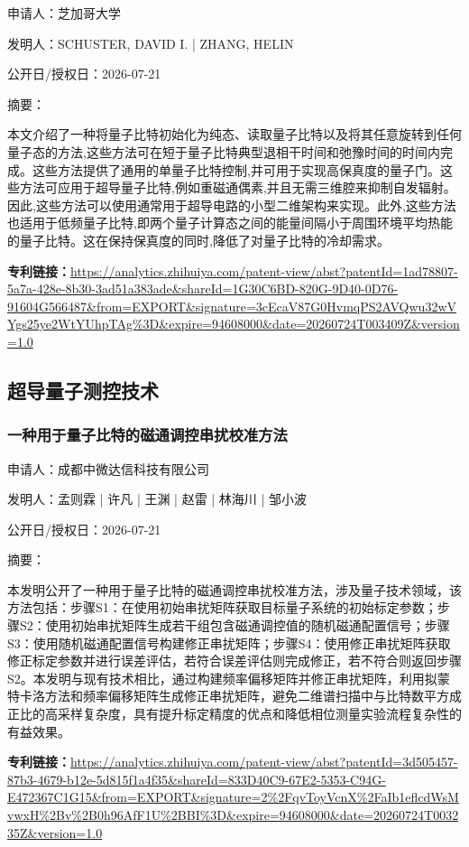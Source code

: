 \documentclass[12pt,a4paper]{ctexart}
\begin{document}
申请人：芝加哥大学

发明人：SCHUSTER, DAVID I. | ZHANG, HELIN

公开日/授权日：2026-07-21

摘要：

本文介绍了一种将量子比特初始化为纯态、读取量子比特以及将其任意旋转到任何量子态的方法,这些方法可在短于量子比特典型退相干时间和弛豫时间的时间内完成。这些方法提供了通用的单量子比特控制,并可用于实现高保真度的量子门。这些方法可应用于超导量子比特,例如重磁通偶素,并且无需三维腔来抑制自发辐射。因此,这些方法可以使用通常用于超导电路的小型二维架构来实现。此外,这些方法也适用于低频量子比特,即两个量子计算态之间的能量间隔小于周围环境平均热能的量子比特。这在保持保真度的同时,降低了对量子比特的冷却需求。

\noindent\textbf{专利链接：}\url{https://analytics.zhihuiya.com/patent-view/abst?patentId=1ad78807-5a7a-428e-8b30-3ad51a383ade&shareId=1G30C6BD-820G-9D40-0D76-91604G566487&from=EXPORT&signature=3cEcaV87G0HvmqPS2AVQwu32wVYgs25ye2WtYUhpTAg%3D&expire=94608000&date=20260724T003409Z&version=1.0}


\subsection{ 超导量子测控技术 }

\subsubsection{ 一种用于量子比特的磁通调控串扰校准方法 }

申请人：成都中微达信科技有限公司

发明人：孟则霖 | 许凡 | 王渊 | 赵雷 | 林海川 | 邹小波

公开日/授权日：2026-07-21

摘要：

本发明公开了一种用于量子比特的磁通调控串扰校准方法，涉及量子技术领域，该方法包括：步骤S1：在使用初始串扰矩阵获取目标量子系统的初始标定参数；步骤S2：使用初始串扰矩阵生成若干组包含磁通调控值的随机磁通配置信号；步骤S3：使用随机磁通配置信号构建修正串扰矩阵；步骤S4：使用修正串扰矩阵获取修正标定参数并进行误差评估，若符合误差评估则完成修正，若不符合则返回步骤S2。本发明与现有技术相比，通过构建频率偏移矩阵并修正串扰矩阵，利用拟蒙特卡洛方法和频率偏移矩阵生成修正串扰矩阵，避免二维谱扫描中与比特数平方成正比的高采样复杂度，具有提升标定精度的优点和降低相位测量实验流程复杂性的有益效果。

\noindent\textbf{专利链接：}\url{https://analytics.zhihuiya.com/patent-view/abst?patentId=3d505457-87b3-4679-b12e-5d815f1a4f35&shareId=833D40C9-67E2-5353-C94G-E472367C1G15&from=EXPORT&signature=2%2FqvToyVcnX%2FaIb1eflcdWsMvwxH%2Bv%2B0h96AfF1U%2BBI%3D&expire=94608000&date=20260724T003235Z&version=1.0}
\end{document}
